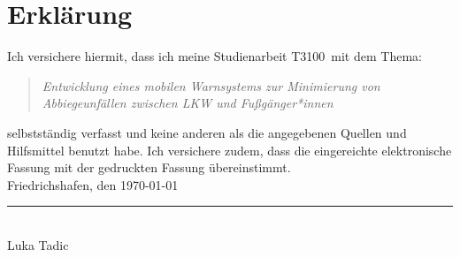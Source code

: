\documentclass[a4paper, 12pt]{article} %
\newcommand{\titel}{Entwicklung eines mobilen Warnsystems zur Minimierung von Abbiegeunfällen zwischen LKW und Fußgänger*innen}
\newcommand{\arbeit}{Studienarbeit T3100}
\newcommand{\autor}{Luka Tadic}
\begin{document}
\begin{titlepage}
\end{titlepage}

\clearpage

\pagestyle{scrheadings}  %
\hypersetup{pageanchor=true}



\section*{Erklärung}

Ich versichere hiermit, dass ich meine \arbeit\ mit dem Thema:

\begin{quote}
    \textit{\titel}
\end{quote}

selbstständig verfasst und keine anderen als die angegebenen Quellen und Hilfsmittel benutzt habe.  
Ich versichere zudem, dass die eingereichte elektronische Fassung mit der gedruckten Fassung übereinstimmt.\\[6ex]

Friedrichshafen, den \today \\[1ex]
\rule[-0.2cm]{5cm}{0.5pt} \\  
\autor \\[10ex]

\rmfamily

\clearpage
\end{document}
